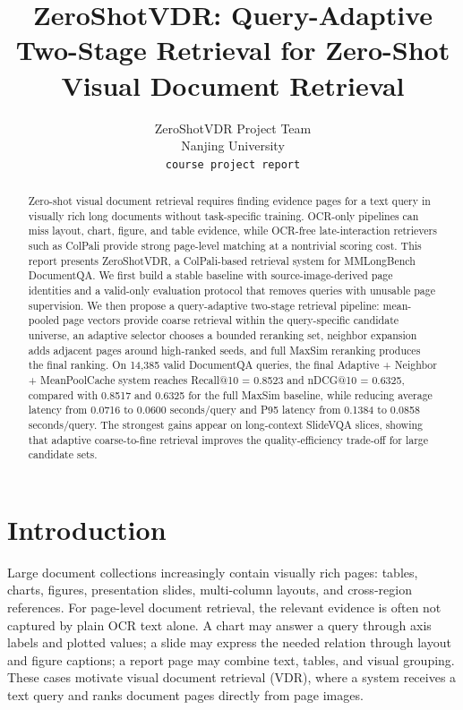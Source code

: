 \documentclass[11pt]{article}
\title{ZeroShotVDR: Query-Adaptive Two-Stage Retrieval for Zero-Shot Visual Document Retrieval}
\author{ZeroShotVDR Project Team \\
  Nanjing University \\
  \texttt{course project report}}
\begin{document}
\maketitle

\begin{abstract}
Zero-shot visual document retrieval requires finding evidence pages for a text query in visually rich long documents without task-specific training. OCR-only pipelines can miss layout, chart, figure, and table evidence, while OCR-free late-interaction retrievers such as ColPali provide strong page-level matching at a nontrivial scoring cost. This report presents ZeroShotVDR, a ColPali-based retrieval system for MMLongBench DocumentQA. We first build a stable baseline with source-image-derived page identities and a valid-only evaluation protocol that removes queries with unusable page supervision. We then propose a query-adaptive two-stage retrieval pipeline: mean-pooled page vectors provide coarse retrieval within the query-specific candidate universe, an adaptive selector chooses a bounded reranking set, neighbor expansion adds adjacent pages around high-ranked seeds, and full MaxSim reranking produces the final ranking. On 14,385 valid DocumentQA queries, the final Adaptive + Neighbor + MeanPoolCache system reaches Recall@10 = 0.8523 and nDCG@10 = 0.6325, compared with 0.8517 and 0.6325 for the full MaxSim baseline, while reducing average latency from 0.0716 to 0.0600 seconds/query and P95 latency from 0.1384 to 0.0858 seconds/query. The strongest gains appear on long-context SlideVQA slices, showing that adaptive coarse-to-fine retrieval improves the quality-efficiency trade-off for large candidate sets.
\end{abstract}

\section{Introduction}

Large document collections increasingly contain visually rich pages: tables, charts, figures, presentation slides, multi-column layouts, and cross-region references. For page-level document retrieval, the relevant evidence is often not captured by plain OCR text alone. A chart may answer a query through axis labels and plotted values; a slide may express the needed relation through layout and figure captions; a report page may combine text, tables, and visual grouping. These cases motivate visual document retrieval (VDR), where a system receives a text query and ranks document pages directly from page images.
\end{document}
